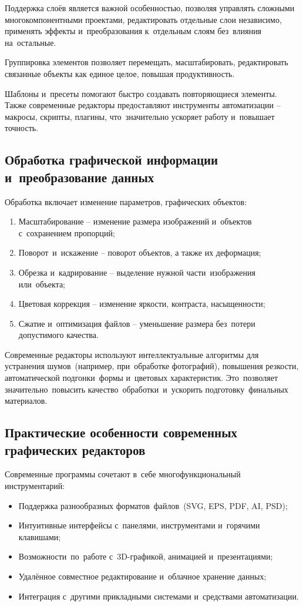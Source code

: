 \documentclass{ou}
\begin{document}
Поддержка слоёв является важной особенностью, позволяя управлять сложными многокомпонентными проектами, редактировать отдельные слои независимо, применять эффекты и~преобразования к~отдельным слоям без~влияния на~остальные.

Группировка элементов позволяет перемещать, масштабировать, редактировать связанные объекты как единое целое, повышая продуктивность.

Шаблоны и~пресеты помогают быстро создавать повторяющиеся элементы. Также современные редакторы предоставляют инструменты автоматизации -- макросы, скрипты, плагины, что~значительно ускоряет работу и~повышает точность.
\subsection{Обработка графической информации и~преобразование данных}

Обработка включает изменение параметров, графических объектов:
\begin{enumerate}[itemindent=2em, nosep, label=\arabic*)]
  \item Масштабирование -- изменение размера изображений и~объектов с~сохранением пропорций;
  \item Поворот~и~искажение -- поворот объектов, а также их деформация;
  \item Обрезка и~кадрирование -- выделение нужной части~изображения или~объекта;
  \item Цветовая коррекция -- изменение яркости, контраста, насыщенности;
  \item Сжатие и~оптимизация файлов -- уменьшение размера без~потери допустимого качества.
\end{enumerate}

Современные редакторы используют интеллектуальные алгоритмы для устранения шумов~(например, при~обработке фотографий), повышения резкости, автоматической подгонки~формы и~цветовых характеристик. Это~позволяет значительно~повысить качество~обработки~и~ускорить подготовку~финальных материалов.
\subsection{Практические особенности современных графических редакторов}
Современные программы сочетают в~себе многофункциональный инструментарий:
\begin{itemize}[label=-, itemindent=2em, nosep]
  \item Поддержка разнообразных форматов~файлов~(SVG, EPS, PDF, AI, PSD);
  \item Интуитивные интерфейсы с~панелями, инструментами и~горячими клавишами;
  \item Возможности~по~работе с~3D-графикой, анимацией и~презентациями;
  \item Удалённое совместное редактирование и~облачное хранение данных;
  \item Интеграция с~другими прикладными системами и~средствами автоматизации.
\end{itemize}
\end{document}
